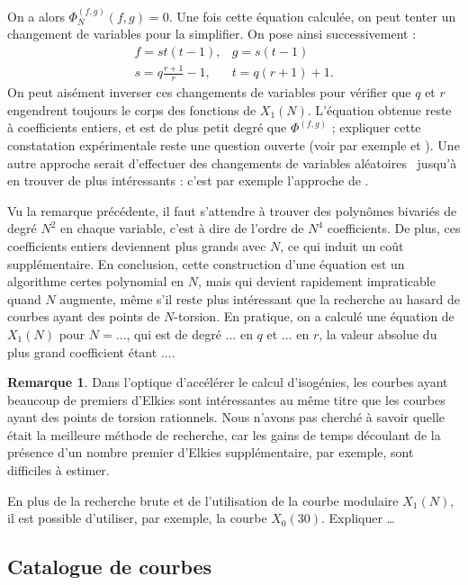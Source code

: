 \documentclass[11pt,a4paper]{article}
\theoremstyle{definition}
\newtheorem*{rem}{Remarque}
\begin{document}
On a alors $\Phi_N^{(f, g)}(f, g) = 0$. Une fois cette équation calculée, on peut tenter  un changement de variables pour la simplifier. On pose ainsi successivement :
$$\begin{matrix} f = st(t-1), & g = s(t-1)\\
 s = q\frac{r+1}{r} - 1, & t = q(r+1) + 1.
 \end{matrix}$$
On peut aisément inverser ces changements de variables pour vérifier que $q$ et $r$ engendrent toujours le corps des fonctions de $X_1(N)$. L'équation obtenue reste à coefficients entiers, et est de plus petit degré que $\Phi^{(f, g)}$ ; expliquer cette constatation expérimentale reste une question ouverte (voir par exemple \cite{Galbraith} et \cite{Baaziz}). Une autre approche serait d'effectuer des changements de variables \og aléatoires \fg\ jusqu'à en trouver de plus intéressants : c'est par exemple l'approche de \cite{Sutheq}.

Vu la remarque précédente, il faut s'attendre à trouver des polynômes bivariés de degré $N^2$ en chaque variable, c'est à dire de l'ordre de $N^4$ coefficients. De plus, ces coefficients entiers deviennent plus grands avec $N$, ce qui induit un coût supplémentaire. En conclusion, cette construction d'une équation est un algorithme certes polynomial en $N$, mais qui devient rapidement impraticable quand $N$ augmente, même s'il reste plus intéressant que la recherche au hasard de courbes ayant des points de $N$-torsion. En pratique, on a calculé une équation de $X_1(N)$ pour $N = \dots$, qui est de degré $\dots$ en $q$ et $\dots$ en $r$, la valeur absolue du plus grand coefficient étant $\dots$.

\begin{rem}
Dans l'optique d'accélérer le calcul d'isogénies, les courbes ayant beaucoup de premiers d'Elkies sont intéressantes au même titre que les courbes ayant des points de torsion rationnels. Nous n'avons pas cherché à savoir quelle était la meilleure méthode de recherche, car les gains de temps découlant de la présence d'un nombre premier d'Elkies supplémentaire, par exemple, sont difficiles à estimer.

En plus de la recherche brute et de l'utilisation de la courbe modulaire $X_1(N)$, il est possible d'utiliser, par exemple, la courbe $X_0(30)$. Expliquer \dots
\end{rem}

\subsection{Catalogue de courbes}
\end{document}
